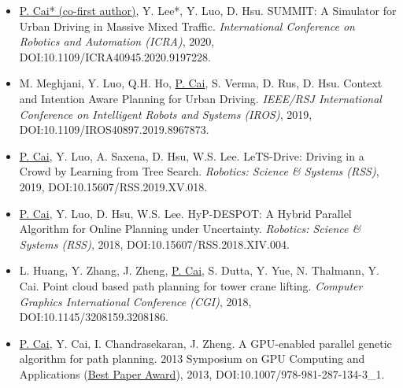 \documentclass[10pt,letterpaper,sans]{moderncv}
\begin{document}
{\begin{itemize}
  \item \underline{P. Cai* (co-first author)}, Y. Lee*, Y. Luo, D. Hsu. SUMMIT: A Simulator for Urban Driving in Massive Mixed Traffic. \textit{International Conference on Robotics and Automation (ICRA)}, 2020, DOI:10.1109/ICRA40945.2020.9197228.
  \item M. Meghjani, Y. Luo, Q.H. Ho, \underline{P. Cai}, S. Verma, D. Rus, D. Hsu. Context and Intention Aware Planning for Urban Driving. \textit{IEEE/RSJ International Conference on Intelligent Robots and Systems (IROS)}, 2019, DOI:10.1109/IROS40897.2019.8967873.
  \item \underline{P. Cai}, Y. Luo, A. Saxena, D. Hsu, W.S. Lee. LeTS-Drive: Driving in a Crowd by Learning from Tree Search. \textit{Robotics: Science \& Systems (RSS)}, 2019, DOI:10.15607/RSS.2019.XV.018.
  \item \underline{P. Cai}, Y. Luo, D. Hsu, W.S. Lee. HyP-DESPOT: A Hybrid Parallel Algorithm for Online Planning under Uncertainty. \textit{Robotics: Science \& Systems (RSS)}, 2018, DOI:10.15607/RSS.2018.XIV.004.
  \item L. Huang, Y. Zhang, J. Zheng, \underline{P. Cai}, S. Dutta, Y. Yue, N. Thalmann, Y. Cai. Point cloud based path planning for tower crane lifting. \textit{Computer Graphics International Conference (CGI)}, 2018, DOI:10.1145/3208159.3208186.
  \item \underline{P. Cai}, Y. Cai, I. Chandrasekaran, J. Zheng. A GPU-enabled parallel genetic algorithm for path planning. 2013 Symposium on GPU Computing and Applications (\underline{Best Paper Award}), 2013, DOI:10.1007/978-981-287-134-3\_1.
\end{itemize}
}
\end{document}

